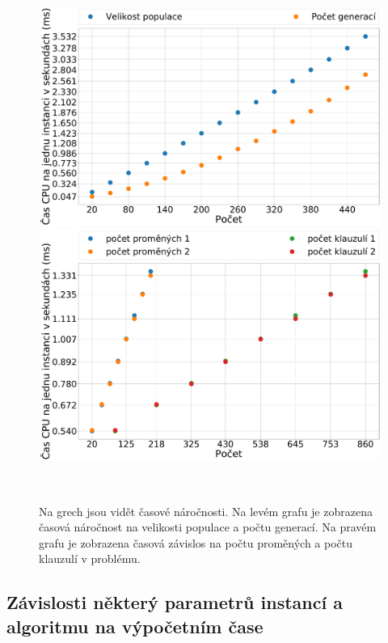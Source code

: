 \documentclass[11pt]{article}
\begin{document}
\begin{figure}
	\centering
    \begin{minipage}[c]{0.42\textwidth}
        \centering\includegraphics[width=\textwidth]{img/time_gen_cnt_sz.pdf} 
    \end{minipage}
    \begin{minipage}[c]{0.42\textwidth}
        \centering \includegraphics[width=\textwidth]{img/time_n_var_cla.pdf} 
    \end{minipage}
    \\
   \caption{Na grech jsou vidět časové náročnosti. Na levém grafu je zobrazena časová náročnost na velikosti populace a počtu generací. Na pravém grafu je zobrazena časová závislos na počtu proměných a počtu klauzulí v problému.}\label{fig:time}
\end{figure} 
\subsection{Závislosti některý parametrů instancí a algoritmu na výpočetním čase}
\end{document}
